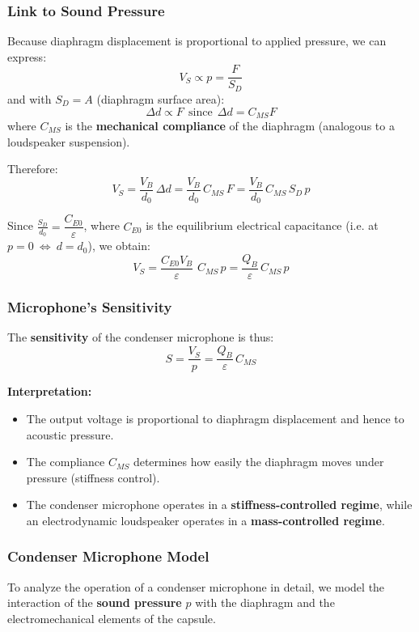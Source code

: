 \subsubsection{Link to Sound Pressure}
Because diaphragm displacement is proportional to applied pressure, we can express:
\[
V_S \propto p = \frac{F}{S_D}
\]
and with \( S_D = A \) (diaphragm surface area):
\[
\Delta d \propto F  \ \  \text{since} \ \  \Delta d = C_{MS}F
\]
where \( C_{MS} \) is the \textbf{mechanical compliance} of the diaphragm (analogous to a loudspeaker suspension).

Therefore:
\[
V_S = \frac{V_B}{d_0} \, \Delta d = \frac{V_B}{d_0} \, C_{MS} \, F = \frac{V_B}{d_0} \, C_{MS} \, S_D \, p
\]

Since \( \frac{S_D}{d_0} = \dfrac{C_{E0}}{\varepsilon} \), where \( C_{E0} \) is the equilibrium electrical capacitance (i.e. at $p=0 \ \Leftrightarrow \ d = d_0$), we obtain:
\[
V_S = \frac{C_{E0}  V_B}{\varepsilon} \, \, C_{MS} \, p = \frac{Q_B}{\varepsilon} \, C_{MS} \, p
\]

\subsubsection{Microphone's Sensitivity}
The \textbf{sensitivity} of the condenser microphone is thus:
\[
S = \frac{V_S}{p} = \frac{Q_B}{\varepsilon} \, C_{MS}
\]

\textbf{Interpretation:}
\begin{itemize}
    \item The output voltage is proportional to diaphragm displacement and hence to acoustic pressure.
    \item The compliance \( C_{MS} \) determines how easily the diaphragm moves under pressure (stiffness control).
    \item The condenser microphone operates in a \textbf{stiffness-controlled regime}, while an electrodynamic loudspeaker operates in a \textbf{mass-controlled regime}.
\end{itemize}

\subsubsection{Condenser Microphone Model}

To analyze the operation of a condenser microphone in detail, we model the interaction of the \textbf{sound pressure} \( p \) with the diaphragm and the electromechanical elements of the capsule.

